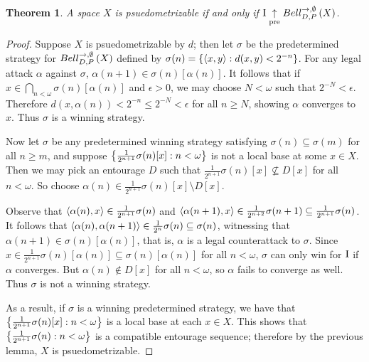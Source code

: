 \documentclass{amsart}
\newtheorem{theorem}{Theorem}[section]
\theoremstyle{definition}
\begin{document}
\begin{theorem}
A space \(X\) is psuedometrizable
if and only if 
\(\mathrm{I}\underset{\text{pre}}{\uparrow}Bell_{D,P}^{\to,\emptyset}\left({X}\right)\). 
\end{theorem}
\begin{proof}
Suppose \(X\) is psuedometrizable by \(d\);
then let \(\sigma\) be the predetermined strategy for \(Bell_{D,P}^{\to,\emptyset}\left({X}\right)\) defined by
\(\sigma(n)=\left\{\left\langle x,y\right\rangle:d(x,y)<2^{-n}\right\}\). 
For any legal attack \(\alpha\) against \(\sigma\), \(\alpha(n+1)\in\sigma(n)[\alpha(n)]\).
It follows that if \(x\in\bigcap_{n<\omega}\sigma(n)[\alpha(n)]\) and \(\epsilon>0\),
we may choose \(N<\omega\) such that \(2^{-N}<\epsilon\). Therefore 
\(d(x,\alpha(n))<2^{-n}\leq 2^{-N}<\epsilon\) for all \(n\geq N\), showing \(\alpha\) converges
to \(x\). Thus \(\sigma\) is a winning strategy.

Now let \(\sigma\) be any predetermined winning strategy satisfying \(\sigma(n)\subseteq\sigma(m)\)
for all \(n\geq m\), and suppose \(\left\{\frac{1}{2^{n+1}}\sigma(n)[x]:n<\omega\right\}\) is not a
local base at some \(x\in X\). Then we may pick an entourage \(D\) such that
\(\frac{1}{2^{n+1}}\sigma(n)[x]\not\subseteq D[x]\) for all \(n<\omega\). So choose
\(\alpha(n)\in\frac{1}{2^{n+1}}\sigma(n)[x]\setminus D[x]\).

Observe that \(\left\langle \alpha(n),x\right\rangle\in\frac{1}{2^{n+1}}\sigma(n)\) and
\(\left\langle \alpha(n+1),x\right\rangle\in\frac{1}{2^{n+2}}\sigma(n+1)\subseteq\frac{1}{2^{n+1}}\sigma(n)\).
It follows that \(\left\langle \alpha(n),\alpha(n+1)\right\rangle\in\frac{1}{2^n}\sigma(n)\subseteq\sigma(n)\),
witnessing that \(\alpha(n+1)\in\sigma(n)[\alpha(n)]\), that is, \(\alpha\) is a legal counterattack
to \(\sigma\). Since \(x\in\frac{1}{2^{n+1}}\sigma(n)[\alpha(n)]\subseteq\sigma(n)[\alpha(n)]\)
for all \(n<\omega\), \(\sigma\) can only win for \(\mathrm{I}\) if \(\alpha\) converges.
But \(\alpha(n)\not\in D[x]\) for all \(n<\omega\), so \(\alpha\) fails to converge as well.
Thus \(\sigma\) is not a winning strategy.

As a result, if \(\sigma\) is a winning predetermined strategy,
we have that \(\left\{\frac{1}{2^{n+1}}\sigma(n)[x]:n<\omega\right\}\) is a
local base at each \(x\in X\). 
This shows that \(\left\{\frac{1}{2^{n+1}}\sigma(n):n<\omega\right\}\)
is a compatible entourage sequence; therefore by the previous lemma,
\(X\) is psuedometrizable.
\end{proof}
\end{document}
